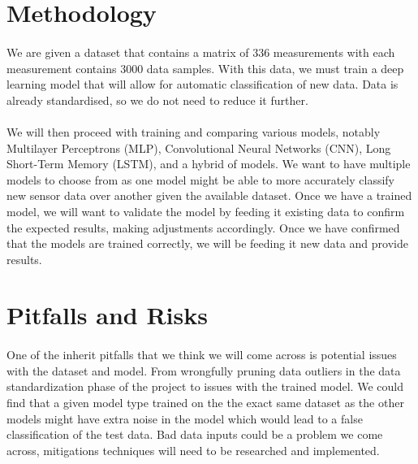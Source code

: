 \documentclass[10pt,letterpaper]{article}
\begin{document}
\section*{Methodology}
\paragraph{}We are given a dataset that contains a matrix of 336 measurements with each measurement contains 3000 data samples. With this data, we must train a deep learning model that will allow for automatic classification of new data. Data is already standardised, so we do not need to reduce it further. 
\paragraph{}We will then proceed with training and comparing various models, notably Multilayer Perceptrons (MLP), Convolutional Neural Networks (CNN), Long Short-Term Memory (LSTM), and a hybrid of models. We want to have multiple models to choose from as one model might be able to more accurately classify new sensor data over another given the available dataset. Once we have a trained model, we will want to validate the model by feeding it existing data to confirm the expected results, making adjustments accordingly. Once we have confirmed that the models are trained correctly, we will be feeding it new data and provide results.
\section*{Pitfalls and Risks}
\paragraph{}One of the inherit pitfalls that we think we will come across is potential issues with the dataset and model. From wrongfully pruning data outliers in the data standardization phase of the project to issues with the trained model. We could find that a given model type trained on the the exact same dataset as the other models might have extra noise in the model which would lead to a false classification of the test data. Bad data inputs could be a problem we come across, mitigations techniques will need to be researched and implemented. 
\end{document}

